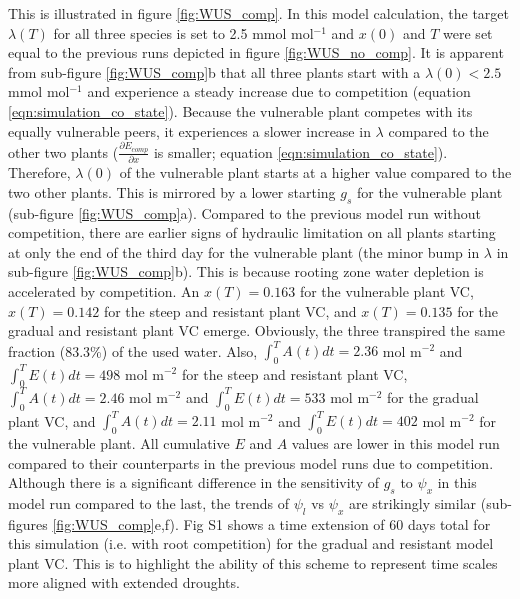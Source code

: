 \documentclass[utf8]{frontiersSCNS} %
\begin{document}
This is illustrated in figure \ref{fig:WUS_comp}. In this model calculation, the target $\lambda(T)$ for all three species is set to 2.5 mmol mol$^{-1}$ and $x(0)$ and $T$ were set equal to the previous runs depicted in figure \ref{fig:WUS_no_comp}. It is apparent from sub-figure \ref{fig:WUS_comp}b that all three plants start with a $\lambda(0) < 2.5$ mmol mol$^{-1}$ and experience a steady increase due to competition (equation \ref{eqn:simulation_co_state}). Because the vulnerable plant competes with its equally vulnerable peers, it experiences a slower increase in $\lambda$ compared to the other two plants ($\frac{\partial E_{comp}}{\partial x}$ is smaller; equation \ref{eqn:simulation_co_state}). Therefore, $\lambda(0)$ of the vulnerable plant starts at a higher value compared to the two other plants. This is mirrored by a lower starting $g_s$ for the vulnerable plant (sub-figure \ref{fig:WUS_comp}a). Compared to the previous model run without competition, there are earlier signs of hydraulic limitation on all plants starting at only the end of the third day for the vulnerable plant (the minor bump in $\lambda$ in sub-figure \ref{fig:WUS_comp}b). This is because rooting zone water depletion is accelerated by competition. An $x(T)=0.163$ for the vulnerable plant VC, $x(T)=0.142$ for the steep and resistant plant VC, and $x(T)=0.135$ for the gradual and resistant plant VC emerge. Obviously, the three transpired the same fraction (83.3\%) of the used water. Also, $\int_0^TA(t)dt= 2.36$ mol m$^{-2}$ and $\int_0^TE(t)dt= 498$ mol m$^{-2}$ for the steep and resistant plant VC, $\int_0^TA(t)dt= 2.46$ mol m$^{-2}$ and $\int_0^TE(t)dt= 533$ mol m$^{-2}$ for the gradual plant VC, and $\int_0^TA(t)dt= 2.11$ mol m$^{-2}$ and $\int_0^TE(t)dt= 402$ mol m$^{-2}$ for the vulnerable plant. All cumulative $E$ and $A$ values are lower in this model run compared to their counterparts in the previous model runs due to competition. Although there is a significant difference in the sensitivity of $g_s$ to $\psi_x$ in this model run compared to the last, the trends of $\psi_l$ vs $\psi_x$ are strikingly similar (sub-figures \ref{fig:WUS_comp}e,f). Fig S1 shows a time extension of 60 days total for this simulation (i.e. with root competition) for the gradual and resistant model plant VC. This is to highlight the ability of this scheme to represent time scales more aligned with extended droughts. 
\end{document}
